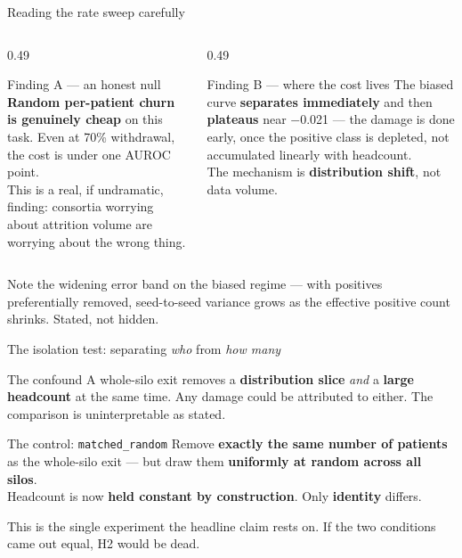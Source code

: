 \documentclass[aspectratio=169, 11pt]{beamer}
\begin{document}
\begin{frame}{Reading the rate sweep carefully}
\begin{columns}[T]
\begin{column}{0.49\textwidth}
\begin{exampleblock}{Finding A --- an honest null}
\textbf{Random per-patient churn is genuinely cheap} on this task. Even at
70\% withdrawal, the cost is under one AUROC point.\\[0.4em]
{\footnotesize This is a real, if undramatic, finding: consortia worrying
about attrition volume are worrying about the wrong thing.}
\end{exampleblock}
\end{column}
\begin{column}{0.49\textwidth}
\begin{alertblock}{Finding B --- where the cost lives}
The biased curve \textbf{separates immediately} and then
\textbf{plateaus} near $-$0.021 --- the damage is done early, once the
positive class is depleted, not accumulated linearly with headcount.\\[0.4em]
{\footnotesize The mechanism is \textbf{distribution shift}, not data volume.}
\end{alertblock}
\end{column}
\end{columns}
\vspace{0.6em}
{\footnotesize Note the widening error band on the biased regime --- with
positives preferentially removed, seed-to-seed variance grows as the effective
positive count shrinks. Stated, not hidden.}
\end{frame}

\begin{frame}{The isolation test: separating \emph{who} from \emph{how many}}
\begin{alertblock}{The confound}
A whole-silo exit removes a \textbf{distribution slice} \emph{and} a
\textbf{large headcount} at the same time. Any damage could be attributed to
either. The comparison is uninterpretable as stated.
\end{alertblock}
\vspace{0.6em}
\begin{exampleblock}{The control: \texttt{matched\_random}}
Remove \textbf{exactly the same number of patients} as the whole-silo exit ---
but draw them \textbf{uniformly at random across all silos}.\\[0.5em]
Headcount is now \textbf{held constant by construction}. Only \textbf{identity}
differs.
\end{exampleblock}
\vspace{0.5em}
{\footnotesize This is the single experiment the headline claim rests on. If
the two conditions came out equal, H2 would be dead.}
\end{frame}
\end{document}
